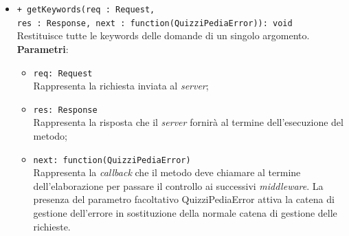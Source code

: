 \begin{itemize}
\begin{itemize}
\begin{itemize}
			\end{itemize}
			\item \texttt{+ getKeywords(req : Request, \\res : Response, next : function(QuizziPediaError)): void} \\
			Restituisce tutte le keywords delle domande di un singolo argomento.  \\
			\textbf{Parametri}:
			\begin{itemize}
			\item \texttt{req: Request} \\
			Rappresenta la richiesta inviata al \textit{server};
			\item \texttt{res: Response} \\
			Rappresenta la risposta che il \textit{server} fornirà al termine dell'esecuzione del metodo;
			\item \texttt{next: function(QuizziPediaError)} \\
			Rappresenta la \textit{callback} che il metodo deve chiamare al termine dell'elaborazione per passare il controllo ai successivi \textit{middleware}. La presenza del parametro facoltativo QuizziPediaError attiva la catena di gestione dell'errore in sostituzione della normale catena di gestione delle richieste.
			\end{itemize}
		\end{itemize}
\end{itemize}
